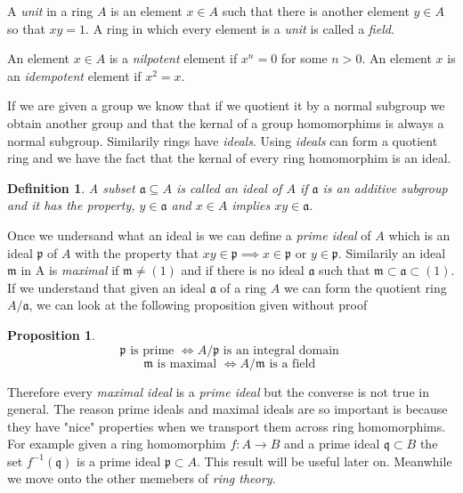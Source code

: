 \documentclass[]{report}
\newtheorem{prop}[theorem]{Proposition}
\newtheorem{defn}[theorem]{Definition}
\begin{document}
A \textit{unit} in a ring $A$ is an element $x\in A$ such that there is another element $y\in A$ so that $xy = 1$. A ring in which every element is a \textit{unit} is called a \textit{field}. 

An element $x\in A$ is a \textit{nilpotent} element if $x^n = 0$ for some $n>0$. An element $x$ is an \textit{idempotent} element if $x^2 = x$. 

If we are given a group we know that if we quotient it by a normal subgroup we obtain another group and that the kernal of a group homomorphims is always a normal subgroup. Similarily rings have \textit{ideals}. Using \textit{ideals} can form a quotient ring and we have the fact that the kernal of every ring homomorphim is an ideal. 

\begin{defn}
    A subset $\mathfrak{a} \subseteq A$ is called an \textit{ideal} of $A$ if $\mathfrak{a}$ is an additive subgroup and it has the property, $y\in \mathfrak{a}$ and $x\in A$ implies $xy\in \mathfrak{a}$.
\end{defn}

Once we undersand what an ideal is we can define a \textit{prime ideal} of $A$ which is an ideal $\mathfrak{p}$ of $A$ with the property that $xy\in \mathfrak{p} \implies x \in \mathfrak{p} \text{ or } y\in \mathfrak{p}$. Similarily an ideal $\mathfrak{m}$ in A is \textit{maximal} if $\mathfrak{m} \neq (1)$ and if there is no ideal $\mathfrak{a}$ such that $\mathfrak{m\subset a\subset} (1)$. If we understand that given an ideal $\mathfrak{a}$ of a ring $A$ we can form the quotient ring $A/\mathfrak{a}$, we can look at the following proposition given without proof

\begin{prop}
    $$\mathfrak{p} \text{ is prime } \Leftrightarrow A/\mathfrak{p} \text{ is an integral domain }$$
    $$\mathfrak{m} \text{ is maximal } \Leftrightarrow A/\mathfrak{m} \text{ is a field }$$
\end{prop}

Therefore every \textit{maximal ideal} is a \textit{prime ideal} but the converse is not true in general. The reason prime ideals and maximal ideals are so important is because they have "nice" properties when we transport them across ring homomorphims. For example given a ring homomorphim $f:A\rightarrow B$ and a prime ideal $\mathfrak{q}\subset B$ the set $f^{-1}(\mathfrak{q})$ is a prime ideal  $\mathfrak{p}\subset A$. This result will be useful later on. Meanwhile we move onto the other memebers of \textit{ring theory}. 
\end{document}
